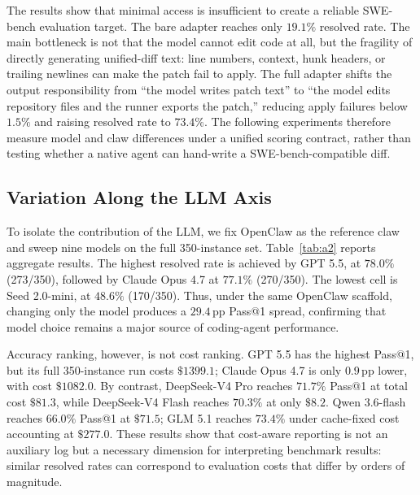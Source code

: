 The results show that minimal access is insufficient to create a reliable SWE-bench evaluation target. The bare adapter reaches only $19.1\%$ resolved rate. The main bottleneck is not that the model cannot edit code at all, but the fragility of directly generating unified-diff text: line numbers, context, hunk headers, or trailing newlines can make the patch fail to apply. The full adapter shifts the output responsibility from ``the model writes patch text'' to ``the model edits repository files and the runner exports the patch,'' reducing apply failures below $1.5\%$ and raising resolved rate to $73.4\%$. The following experiments therefore measure model and claw differences under a unified scoring contract, rather than testing whether a native agent can hand-write a SWE-bench-compatible diff.

\subsection{Variation Along the LLM Axis}\label{sec:variation_llms}

To isolate the contribution of the LLM, we fix OpenClaw as the reference claw and sweep nine models on the full 350-instance set. Table~\ref{tab:a2} reports aggregate results. The highest resolved rate is achieved by GPT 5.5, at $78.0\%$ (273/350), followed by Claude Opus 4.7 at $77.1\%$ (270/350). The lowest cell is Seed 2.0-mini, at $48.6\%$ (170/350). Thus, under the same OpenClaw scaffold, changing only the model produces a $29.4$\,pp Pass@1 spread, confirming that model choice remains a major source of coding-agent performance.

Accuracy ranking, however, is not cost ranking. GPT 5.5 has the highest Pass@1, but its full 350-instance run costs $\$1399.1$; Claude Opus 4.7 is only $0.9$\,pp lower, with cost $\$1082.0$. By contrast, DeepSeek-V4 Pro reaches $71.7\%$ Pass@1 at total cost $\$81.3$, while DeepSeek-V4 Flash reaches $70.3\%$ at only $\$8.2$. Qwen 3.6-flash reaches $66.0\%$ Pass@1 at $\$71.5$; GLM 5.1 reaches $73.4\%$ under cache-fixed cost accounting at $\$277.0$. These results show that cost-aware reporting is not an auxiliary log but a necessary dimension for interpreting benchmark results: similar resolved rates can correspond to evaluation costs that differ by orders of magnitude.

